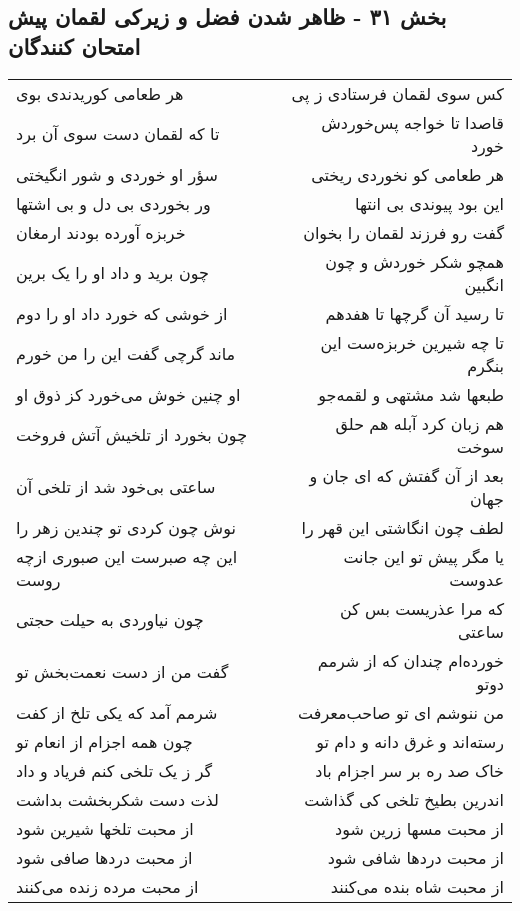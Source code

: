 \begin{center}
\section*{بخش ۳۱ - ظاهر شدن فضل و زیرکی لقمان پیش امتحان کنندگان}
\label{sec:sh031}
\begin{longtable}{l p{0.5cm} r}
هر طعامی کوریدندی بوی
&&
کس سوی لقمان فرستادی ز پی
\\
تا که لقمان دست سوی آن برد
&&
قاصدا تا خواجه پس‌خوردش خورد
\\
سؤر او خوردی و شور انگیختی
&&
هر طعامی کو نخوردی ریختی
\\
ور بخوردی بی دل و بی اشتها
&&
این بود پیوندی بی انتها
\\
خربزه آورده بودند ارمغان
&&
گفت رو فرزند لقمان را بخوان
\\
چون برید و داد او را یک برین
&&
همچو شکر خوردش و چون انگبین
\\
از خوشی که خورد داد او را دوم
&&
تا رسید آن گرچها تا هفدهم
\\
ماند گرچی گفت این را من خورم
&&
تا چه شیرین خربزه‌ست این بنگرم
\\
او چنین خوش می‌خورد کز ذوق او
&&
طبعها شد مشتهی و لقمه‌جو
\\
چون بخورد از تلخیش آتش فروخت
&&
هم زبان کرد آبله هم حلق سوخت
\\
ساعتی بی‌خود شد از تلخی آن
&&
بعد از آن گفتش که ای جان و جهان
\\
نوش چون کردی تو چندین زهر را
&&
لطف چون انگاشتی این قهر را
\\
این چه صبرست این صبوری ازچه روست
&&
یا مگر پیش تو این جانت عدوست
\\
چون نیاوردی به حیلت حجتی
&&
که مرا عذریست بس کن ساعتی
\\
گفت من از دست نعمت‌بخش تو
&&
خورده‌ام چندان که از شرمم دوتو
\\
شرمم آمد که یکی تلخ از کفت
&&
من ننوشم ای تو صاحب‌معرفت
\\
چون همه اجزام از انعام تو
&&
رسته‌اند و غرق دانه و دام تو
\\
گر ز یک تلخی کنم فریاد و داد
&&
خاک صد ره بر سر اجزام باد
\\
لذت دست شکربخشت بداشت
&&
اندرین بطیخ تلخی کی گذاشت
\\
از محبت تلخها شیرین شود
&&
از محبت مسها زرین شود
\\
از محبت دردها صافی شود
&&
از محبت دردها شافی شود
\\
از محبت مرده زنده می‌کنند
&&
از محبت شاه بنده می‌کنند
\\

\end{longtable}
\end{center}
